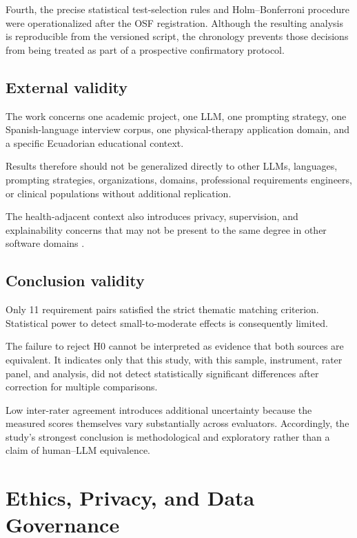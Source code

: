 \documentclass[pdflatex,sn-basic]{sn-jnl}
\begin{document}
Fourth, the precise statistical test-selection rules and Holm--Bonferroni procedure were operationalized after the OSF registration. Although the resulting analysis is reproducible from the versioned script, the chronology prevents those decisions from being treated as part of a prospective confirmatory protocol.

\subsection{External validity}

The work concerns one academic project, one LLM, one prompting strategy, one Spanish-language interview corpus, one physical-therapy application domain, and a specific Ecuadorian educational context.

Results therefore should not be generalized directly to other LLMs, languages, prompting strategies, organizations, domains, professional requirements engineers, or clinical populations without additional replication.

The health-adjacent context also introduces privacy, supervision, and explainability concerns that may not be present to the same degree in other software domains \citep{chazette2020explainability,oecd2019ai,ecuador2021lopdp}.

\subsection{Conclusion validity}

Only 11 requirement pairs satisfied the strict thematic matching criterion. Statistical power to detect small-to-moderate effects is consequently limited.

The failure to reject H0 cannot be interpreted as evidence that both sources are equivalent. It indicates only that this study, with this sample, instrument, rater panel, and analysis, did not detect statistically significant differences after correction for multiple comparisons.

Low inter-rater agreement introduces additional uncertainty because the measured scores themselves vary substantially across evaluators. Accordingly, the study's strongest conclusion is methodological and exploratory rather than a claim of human--LLM equivalence.

\section{Ethics, Privacy, and Data Governance}
\end{document}
